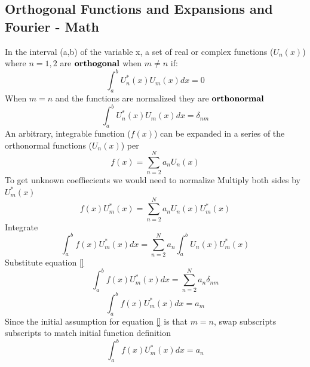 \documentclass[12pt]{article}
\begin{document}
\subsection{Orthogonal Functions and Expansions and Fourier - Math} \label{sectionOrtho}
    In the interval (a,b) of the variable x, a set of real or complex functions ($U_n(x)$) where $n=1,2$ are $\bold{orthogonal}$ when $m \neq n$ if:
    \begin{equation} \label{eq: 11-11-1}
        \int_a^b U_n^*(x) U_m(x)dx = 0 
    \end{equation}
    When $m=n$ and the functions are normalized they are $\bold{orthonormal}$
    \begin{equation} \label{eq: 11-11-2}
        \int_a^b U_n^*(x) U_m(x)dx = \delta_{nm}
    \end{equation}
    An arbitrary, integrable function ($f(x)$) can be expanded in a series of the orthonormal functions ($U_n(x)$) per 
    \begin{equation} \label{eq: 11-11-3}
        f(x) = \sum_{n=2}^N a_n U_n(x)
    \end{equation}
    To get unknown coeffiecients we would need to normalize
    \newline Multiply both sides by $U_m^*(x)$
    \begin{equation} \label{eq: 11-11-4}
        f(x)U_m^*(x) = \sum_{n=2}^N a_n U_n(x) U_m^*(x)
    \end{equation}
    Integrate
    \begin{equation} \label{eq: 11-11-5}
        \int_a^b f(x)U_m^*(x) dx = \sum_{n=2}^N a_n \int_a^b U_n(x) U_m^*(x)
    \end{equation}
    Substitute equation \ref{}
    \begin{equation} \label{eq: 11-11-6}
        \int_a^b f(x)U_m^*(x) dx = \sum_{n=2}^N a_n \delta_{nm}        
    \end{equation}
    \begin{equation} \label{eq: 11-11-7}
        \int_a^b f(x)U_m^*(x) dx = a_m
    \end{equation}    
    Since the initial assumption for equation \ref{} is that $m=n$, swap subscripts subscripts to match initial function definition
    \begin{equation} \label{eq: 11-11-8}
        \int_a^b f(x)U_m^*(x) dx = a_n
    \end{equation}    
\end{document}
